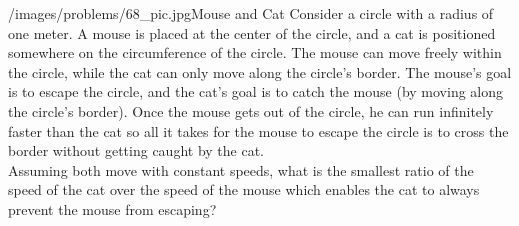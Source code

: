 \begin{problem}{/images/problems/68_pic.jpg}{Mouse and Cat} Consider a circle with a radius of one meter. A mouse is placed at the center of the circle, and a cat is positioned somewhere on the circumference of the circle. The mouse can move freely within the circle, while the cat can only move along the circle's border. The mouse's goal is to escape the circle, and the cat's goal is to catch the mouse (by moving along the circle's border).
Once the mouse gets out of the circle, he can run infinitely faster than the cat so all it takes for the mouse to escape the circle is to cross the border without getting caught by the cat.\\[0.2cm]

Assuming both move with constant speeds, what is the smallest ratio of the speed of the cat over the speed of the mouse which enables the cat to always prevent the mouse from escaping?
\end{problem}

